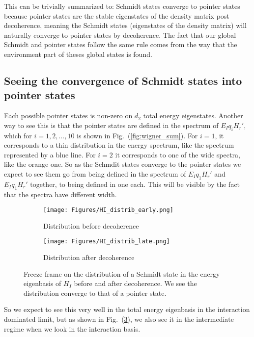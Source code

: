 \documentclass{article}
\begin{document}
This can be trivially summarized to: Schmidt states converge to pointer states because pointer states are the stable eigenstates of the density matrix post decoherence, meaning the Schmidt states (eigenstates of the density matrix) will naturally converge to pointer states by decoherence. The fact that our global Schmidt and pointer states follow the same rule comes from the way that the environment part of theses global states is found. 


\subsection{Seeing the convergence of Schmidt states into pointer states}

Each possible pointer states is non-zero on $d_2$ total energy eigenstates. Another way to see this is that the pointer states are defined in the spectrum of $E_Iq_iH_r'$, which for $i=1,2,...,10$ is shown in Fig.~(\ref{fig:wigner_sum}). For $i=1$, it corresponds to a thin distribution in the energy spectrum, like the spectrum represented by a blue line. For $i=2$ it corresponds to one of the wide spectra, like the orange one. So as the Schmdit states converge to the pointer states we expect to see them go from being defined in the spectrum of $E_Iq_1H_r'$ and $E_Iq_1H_r'$ together, to being defined in one each. This will be visible by the fact that the spectra have different width.

\begin{figure}[h!]
  \centering
  \begin{subfigure}[b]{0.49\linewidth}
    \texttt{[image: Figures/HI\_distrib\_early.png]}
    \label{fig:1}
    \caption{Distribution before decoherence}
  \end{subfigure}
  \begin{subfigure}[b]{0.49\linewidth}
    \texttt{[image: Figures/HI\_distrib\_late.png]}
    \label{fig:2}
    \caption{Distribution after decoherence}
  \end{subfigure}
  \caption{}
  \label{fig:dist_EI_dep}
  \caption{Freeze frame on the distribution of a Schmidt state in the energy eigenbasis of $H_I$ before and after decoherence. We see the distribution converge to that of a pointer state.}
\end{figure}
So we expect to see this very well in the total energy eigenbasis in the interaction dominated limit, but as shown in Fig.~(\ref{fig:dist_EI_dep}), we also see it in the intermediate regime when we look in the interaction basis.
\end{document}
